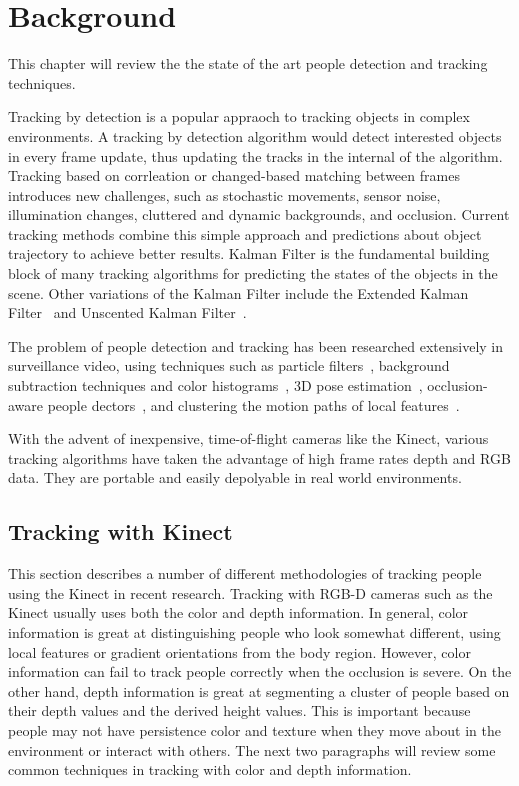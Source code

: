


\chapter{Background}

\label{chapter:background}

This chapter will review the the state of the art people detection and tracking techniques.

Tracking by detection is a popular appraoch to tracking objects in complex environments. A tracking by detection algorithm would detect interested objects in every frame update, thus updating the tracks in the internal of the algorithm. Tracking based on corrleation or changed-based matching between frames introduces new challenges, such as stochastic movements, sensor noise, illumination changes, cluttered and dynamic backgrounds, and occlusion. Current tracking methods combine this simple approach and predictions about object trajectory to achieve better results. Kalman Filter is the fundamental building block of many tracking algorithms for predicting the states of the objects in the scene. Other variations of the Kalman Filter include the Extended Kalman Filter~\cite{ljung_extended_kalman} and Unscented Kalman Filter~\cite{julier_unscented_kalman}.

The problem of people detection and tracking has been researched extensively in surveillance video, using techniques such as particle filters~\cite{sherrah_particle_filter_video_surveillance}, background subtraction techniques and color histograms~\cite{mckenna_tracking_groups_of_people}, 3D pose estimation~\cite{andriluka_3d_pose_estimation_tracking}, occlusion-aware people dectors~\cite{tang_people_dectector}, and clustering the motion paths of local features~\cite{gudys_cluster_local_features}.

With the advent of inexpensive, time-of-flight cameras like the Kinect, various tracking algorithms have taken the advantage of high frame rates depth and RGB data. They are portable and easily depolyable in real world environments.

\section{Tracking with Kinect}

This section describes a number of different methodologies of tracking people using the Kinect in recent research. Tracking with RGB-D cameras such as the Kinect usually uses both the color and depth information. In general, color information is great at distinguishing people who look somewhat different, using local features or gradient orientations from the body region. However, color information can fail to track people correctly when the occlusion is severe. On the other hand, depth information is great at segmenting a cluster of people based on their depth values and the derived height values. This is important because people may not have persistence color and texture when they move about in the environment or interact with others. The next two paragraphs will review some common techniques in tracking with color and depth information.

